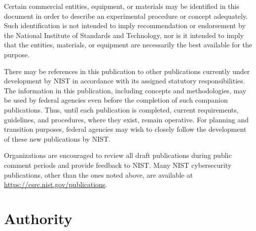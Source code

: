 \pagestyle{empty}


\titleformat{\section}{\normalsize\bfseries\sffamily}{}{0em}{}
\titleformat{\subsection}{\normalsize\bfseries\sffamily}{}{0em}{}
\titleformat{\subsubsection}{\normalsize\bfseries\sffamily}{}{0em}{}
\titleformat{\paragraph}{\normalsize\bfseries\sffamily}{}{0em}{}

Certain commercial entities, equipment, or materials may be identified in this document in order to describe an experimental procedure or concept adequately. Such identification is not intended to imply recommendation or endorsement by the National Institute of Standards and Technology, nor is it intended to imply that the entities, materials, or equipment are necessarily the best available for the purpose. 

There may be references in this publication to other publications currently under development by NIST in accordance with its assigned statutory responsibilities. The information in this publication, including concepts and methodologies, may be used by federal agencies even before the completion of such companion publications. Thus, until each publication is completed, current requirements, guidelines, and procedures, where they exist, remain operative. For planning and transition purposes, federal agencies may wish to closely follow the development of these new publications by NIST.  

Organizations are encouraged to review all draft publications during public comment periods and provide feedback to NIST. Many NIST cybersecurity publications, other than the ones noted above, are available at \url{https://csrc.nist.gov/publications}.


\section*{Authority}

